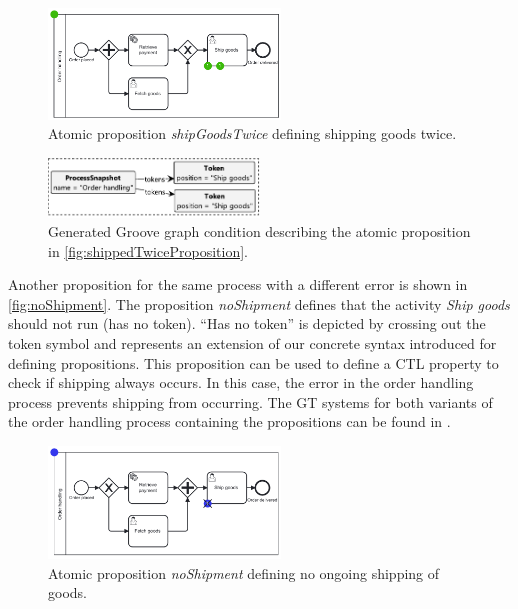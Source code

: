\documentclass{lmcs} %
\begin{document}
\begin{figure}[ht]
    \centering
    \includegraphics[width=0.55\textwidth]{images/shippedTwiceProposition.pdf}
    \caption{Atomic proposition \textit{shipGoodsTwice} defining shipping goods twice.}
    \label{fig:shippedTwiceProposition}
\end{figure}

\begin{figure}[ht]
    \centering
    \includegraphics[width=0.5\textwidth]{images/twice.pdf}
    \caption{Generated Groove graph condition describing the atomic proposition in \autoref{fig:shippedTwiceProposition}.}
    \label{fig:shippedTwiceGroove}
\end{figure}

Another proposition for the same process with a different error is shown in \autoref{fig:noShipment}.
The proposition \textit{noShipment} defines that the activity \textit{Ship goods} should not run (has no token).
\enquote{Has no token} is depicted by crossing out the token symbol and represents an extension of our concrete syntax introduced for defining propositions.
This proposition can be used to define a CTL property to check if shipping always occurs.
In this case, the error in the order handling process prevents shipping from occurring.
The GT systems for both variants of the order handling process containing the propositions can be found in \cite{timkrauterLMCS2024Artifacts2023}.

\begin{figure}[ht]
    \centering
    \includegraphics[width=0.55\textwidth]{images/noShipment.pdf}
    \caption{Atomic proposition \textit{noShipment} defining no ongoing shipping of goods.}
    \label{fig:noShipment}
\end{figure}
\end{document}
